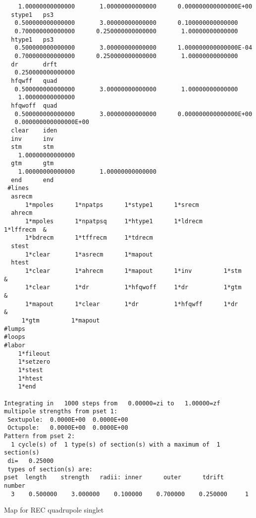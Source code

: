 \begin{footnotesize}
\begin{verbatim}
    1.00000000000000       1.00000000000000      0.000000000000000E+00
  stype1   ps3
   0.500000000000000       3.00000000000000      0.100000000000000
   0.700000000000000      0.250000000000000       1.00000000000000
  htype1   ps3
   0.500000000000000       3.00000000000000      1.000000000000000E-04
   0.700000000000000      0.250000000000000       1.00000000000000
  dr       drft
   0.250000000000000
  hfqwff   quad
   0.500000000000000       3.00000000000000       1.00000000000000
    1.00000000000000
  hfqwoff  quad
   0.500000000000000       3.00000000000000      0.000000000000000E+00
   0.000000000000000E+00
  clear    iden
  inv      inv
  stm      stm
    1.00000000000000
  gtm      gtm
    1.00000000000000       1.00000000000000
  end      end
 #lines
  asrecm
      1*mpoles      1*npatps      1*stype1      1*srecm
  ahrecm
      1*mpoles      1*npatpsq     1*htype1      1*ldrecm      1*lffrecm  &
      1*bdrecm      1*tffrecm     1*tdrecm
  stest
      1*clear       1*asrecm      1*mapout
  htest
      1*clear       1*ahrecm      1*mapout      1*inv         1*stm      &
      1*clear       1*dr          1*hfqwoff     1*dr          1*gtm      &
      1*mapout      1*clear       1*dr          1*hfqwff      1*dr       &
     1*gtm         1*mapout
#lumps
#loops
#labor
    1*fileout
    1*setzero
    1*stest
    1*htest
    1*end

Integrating in   1000 steps from   0.00000=zi to   1.00000=zf
multipole strengths from pset 1:
 Sextupole:  0.0000E+00  0.0000E+00
 Octupole:   0.0000E+00  0.0000E+00
Pattern from pset 2:
  1 cycle(s) of  1 type(s) of section(s) with a maximum of  1 section(s)
 di=   0.25000
 types of section(s) are:
pset  length    strength   radii: inner      outer      tdrift    number
  3    0.500000    3.000000    0.100000    0.700000    0.250000     1
\end{verbatim}
\end{footnotesize}
Map for REC quadrupole singlet
